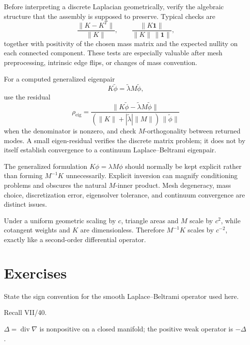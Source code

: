 \begin{remark}
Before interpreting a discrete Laplacian geometrically, verify the algebraic
structure that the assembly is supposed to preserve.  Typical checks are
\[
\frac{\|K-K^T\|}{\|K\|},
\qquad
\frac{\|K\mathbf 1\|}{\|K\|\,\|\mathbf1\|},
\]
together with positivity of the chosen mass matrix and the expected nullity on
each connected component.  These tests are especially valuable after mesh
preprocessing, intrinsic edge flips, or changes of mass convention.

For a computed generalized eigenpair
\[
K\widetilde\phi=\widetilde\lambda M\widetilde\phi,
\]
use the residual
\[
\rho_{\mathrm{eig}}
=
\frac{\|K\widetilde\phi-\widetilde\lambda
M\widetilde\phi\|}
     {(\|K\|+|\widetilde\lambda|\|M\|)\,
      \|\widetilde\phi\|}
\]
when the denominator is nonzero, and check \(M\)-orthogonality between returned
modes.  A small eigen-residual verifies the discrete matrix problem; it does not
by itself establish convergence to a continuum Laplace--Beltrami eigenpair.

The generalized formulation \(K\phi=\lambda M\phi\) should normally be kept
explicit rather than forming \(M^{-1}K\) unnecessarily.  Explicit inversion can
magnify conditioning problems and obscures the natural \(M\)-inner product.
Mesh degeneracy, mass choice, discretization error, eigensolver tolerance, and
continuum convergence are distinct issues.
\end{remark}

Under a uniform geometric scaling by \(c\), triangle areas and \(M\) scale by
\(c^2\), while cotangent weights and \(K\) are dimensionless.  Therefore
\(M^{-1}K\) scales by \(c^{-2}\), exactly like a second-order differential
operator.


\section{Exercises}

\begin{exercise}\label{exr:vii41-01}
State the sign convention for the smooth Laplace--Beltrami operator used here.
\end{exercise}

\begin{hint}
Recall VII/40.
\end{hint}

\begin{solution}
\(\Delta=\operatorname{div}\nabla\) is nonpositive on a closed manifold; the positive weak operator is \(-\Delta\).
\end{solution}

